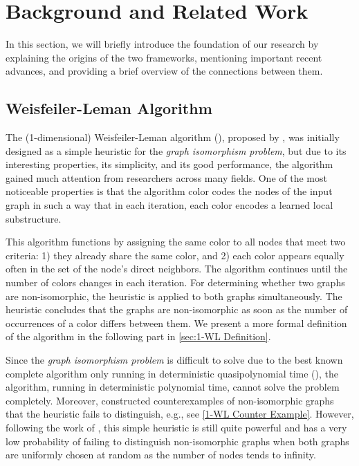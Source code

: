 \cleardoubleoddstandardpage
\chapter{Background and Related Work}\label{sec:related_work}
In this section, we will briefly introduce the foundation of our research by explaining the origins of the two frameworks, mentioning important recent advances, and providing a brief overview of the connections between them.

\section{Weisfeiler-Leman Algorithm}\label{sec:related_work_wl}
The (1-dimensional) Weisfeiler-Leman algorithm (\wl), proposed by \cite{Wei+1968}, was initially designed as a simple heuristic for the \textit{graph isomorphism problem}, but due to its interesting properties, its simplicity, and its good performance, the \wl algorithm gained much attention from researchers across many fields. One of the most noticeable properties is that the algorithm color codes the nodes of the input graph in such a way that in each iteration, each color encodes a learned local substructure.

This algorithm functions by assigning the same color to all nodes that meet two criteria: 1) they already share the same color, and 2) each color appears equally often in the set of the node's direct neighbors. The algorithm continues until the number of colors changes in each iteration. For determining whether two graphs are non-isomorphic, the heuristic is applied to both graphs simultaneously. The heuristic concludes that the graphs are non-isomorphic as soon as the number of occurrences of a color differs between them. We present a more formal definition of the algorithm in the following part in \cref{sec:1-WL Definition}.

Since the \textit{graph isomorphism problem} is difficult to solve due to the best known complete algorithm only running in deterministic quasipolynomial time (\cite{Babai2016}), the \wl algorithm, running in deterministic polynomial time, cannot solve the problem completely. Moreover, \cite{Cai1992} constructed counterexamples of non-isomorphic graphs that the heuristic fails to distinguish, e.g., see \cref{1-WL Counter Example}. However, following the work of \cite{Bab+1979}, this simple heuristic is still quite powerful and has a very low probability of failing to distinguish non-isomorphic graphs when both graphs are uniformly chosen at random as the number of nodes tends to infinity.

